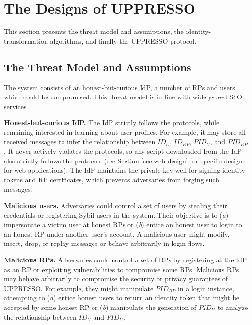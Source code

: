 \section{The Designs of UPPRESSO}
\label{sec:UPPRESSO}

This section presents the threat model and assumptions, the identity-transformation algorithms, and finally the UPPRESSO protocol.

\subsection{The Threat Model and Assumptions}
\label{subsec:threatmodel}
The system consists of an honest-but-curious IdP,
 a number of RPs and users which could be compromised. %
This threat model is in line with widely-used SSO services \cite{OpenIDConnect,rfc6749, SAML, SAMLIdentifier}.

\noindent \textbf{Honest-but-curious IdP.} The IdP strictly follows the protocols,
 while remaining interested in learning about user profiles.
For example, it may store all received messages to infer the relationship between $ID_U$, $ID_{RP}$, $PID_{U}$, and $PID_{RP}$.
It never actively violates the protocols, so any script downloaded from the IdP also strictly follows the protocols (see Section \ref{sec:web-design} for specific designs for web applications).
The IdP maintains the private key well for signing identity tokens and RP certificates, %
which prevents adversaries from forging such messages.

\noindent \textbf{Malicious users.} Adversaries could control a set of users by stealing their credentials or registering Sybil users in the system.
 Their objective is to (\emph{a}) impersonate a victim user at honest RPs or (\emph{b}) entice an honest user to login to an honest RP under another user's account.
A malicious user might modify, insert, drop, or replay messages or behave arbitrarily in login flows.

\noindent \textbf{Malicious RPs.}
Adversaries could control a set of RPs by registering at the IdP as an RP or exploiting vulnerabilities to compromise some RPs. Malicious RPs may behave arbitrarily to compromise the security or privacy guarantees of UPPRESSO.
For example, they might manipulate $PID_{RP}$ in a login instance, attempting to (\emph{a}) entice honest users to return an identity token that might be accepted by some honest RP or (\emph{b}) manipulate the generation of $PID_U$ to analyze the relationship between $ID_U$ and $PID_U$.


